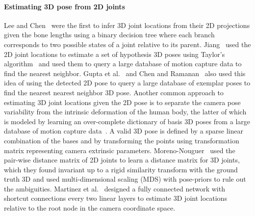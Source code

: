 \documentclass[runningheads]{llncs}
\begin{document}
\paragraph{Estimating 3D pose from 2D joints}

Lee and Chen~\cite{Chen85b} were the first to infer 3D joint locations from their 2D projections given the bone lengths using a  binary decision tree where each branch corresponds to two possible states of a joint relative to its parent. Jiang~\cite{jiang20103d} used the 2D joint locations to estimate a set of hypothesis 3D poses using Taylor's algorithm~\cite{taylor2000reconstruction} and used them to query a large database of motion capture data to find the nearest neighbor. Gupta et al.~\cite{gupta20143dpose} and Chen and Ramanan~\cite{chen20163d} also used this idea of using the detected 2D pose to query a large database of exemplar poses to find the nearest nearest neighbor 3D pose. Another common approach to estimating 3D joint locations given the 2D pose is to separate the camera pose variability from the intrinsic deformation of the human body, the latter of which is modeled by learning an over-complete dictionary of basis 3D poses from a large database of motion capture data~\cite{ramakrishna2012reconstructing,zhou2016sparseness,bogo2016keep,akhter2015pose,wang2014robust}. A valid 3D pose is defined by a sparse linear combination of the bases and by transforming the points using transformation matrix representing camera extrinsic parameters. Moreno-Nouguer~\cite{distance-matrix} used the pair-wise distance matrix of 2D joints to learn a distance matrix for 3D joints, which they found invariant up to a rigid similarity transform with the ground truth 3D and used multi-dimensional scaling (MDS) with pose-priors to rule out the ambiguities. Martinez et al.~\cite{JMartinez:ICCV:2017} designed a fully connected network with shortcut connections every two linear layers to estimate 3D joint locations relative to the root node in the camera coordinate space.
\end{document}

